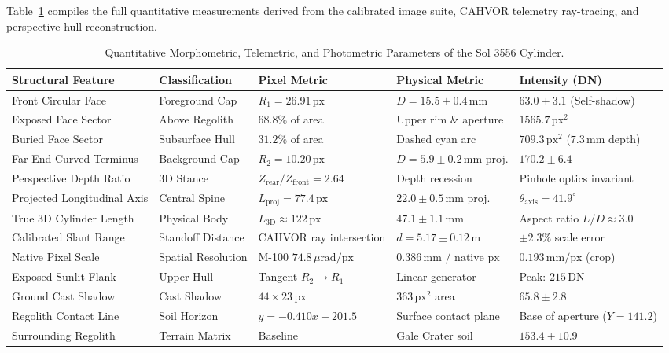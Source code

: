 \documentclass[11pt,a4paper]{article}
\begin{document}
Table~\ref{tab:metrics} compiles the full quantitative measurements derived from the calibrated image suite, CAHVOR telemetry ray-tracing, and perspective hull reconstruction.

\begin{table}[htbp]
    \centering
    \small
    \caption{Quantitative Morphometric, Telemetric, and Photometric Parameters of the Sol 3556 Cylinder.}
    \label{tab:metrics}
    \begin{tabularx}{\textwidth}{>{\raggedright\arraybackslash}p{3.2cm} >{\raggedright\arraybackslash}p{2.3cm} >{\raggedleft\arraybackslash}p{2.2cm} >{\raggedleft\arraybackslash}p{2.6cm} >{\raggedleft\arraybackslash}X}
        \toprule
        \textbf{Structural Feature} & \textbf{Classification} & \textbf{Pixel Metric} & \textbf{Physical Metric} & \textbf{Intensity (DN)} \\
        \midrule
        Front Circular Face & Foreground Cap & $R_1 = 26.91\,\text{px}$ & $D = 15.5 \pm 0.4\,\text{mm}$ & $63.0 \pm 3.1$ \scriptsize(Self-shadow) \\
        Exposed Face Sector & Above Regolith & $68.8\%$ of area & Upper rim \& aperture & $1565.7\,\text{px}^2$ \\
        Buried Face Sector & Subsurface Hull & $31.2\%$ of area & Dashed cyan arc & $709.3\,\text{px}^2$ ($7.3\,\text{mm}$ depth) \\
        \addlinespace
        Far-End Curved Terminus & Background Cap & $R_2 = 10.20\,\text{px}$ & $D = 5.9 \pm 0.2\,\text{mm}$ proj. & $170.2 \pm 6.4$ \\
        Perspective Depth Ratio & 3D Stance & $Z_{\text{rear}}/Z_{\text{front}} = 2.64$ & Depth recession & Pinhole optics invariant \\
        Projected Longitudinal Axis & Central Spine & $L_{\text{proj}} = 77.4\,\text{px}$ & $22.0 \pm 0.5\,\text{mm}$ proj. & $\theta_{\text{axis}} = 41.9^\circ$ \\
        True 3D Cylinder Length & Physical Body & $L_{\text{3D}} \approx 122\,\text{px}$ & $47.1 \pm 1.1\,\text{mm}$ & Aspect ratio $L/D \approx 3.0$ \\
        \addlinespace
        Calibrated Slant Range & Standoff Distance & CAHVOR ray intersection & $d = 5.17 \pm 0.12\,\text{m}$ & $\pm 2.3\%$ scale error \\
        Native Pixel Scale & Spatial Resolution & M-100 $74.8\,\mu\text{rad/px}$ & $0.386\,\text{mm / native px}$ & $0.193\,\text{mm/px}$ (crop) \\
        Exposed Sunlit Flank & Upper Hull & Tangent $R_2 \to R_1$ & Linear generator & Peak: $215\,\text{DN}$ \\
        Ground Cast Shadow & Cast Shadow & $44 \times 23\,\text{px}$ & $363\,\text{px}^2$ area & $65.8 \pm 2.8$ \\
        Regolith Contact Line & Soil Horizon & $y = -0.410 x + 201.5$ & Surface contact plane & Base of aperture ($Y = 141.2$) \\
        Surrounding Regolith & Terrain Matrix & Baseline & Gale Crater soil & $153.4 \pm 10.9$ \\
        \bottomrule
    \end{tabularx}
\end{table}
\end{document}
